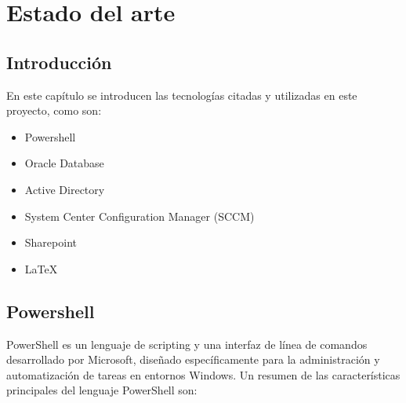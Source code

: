 \documentclass[a4paper, 12pt]{book}
\begin{document}
\cleardoublepage
\chapter{Estado del arte}
\label{chap:estado}

\section{Introducción}
\label{sec:Introducción}

En este capítulo se introducen las tecnologías citadas y utilizadas en este proyecto, como son:

\begin{itemize}
\item Powershell

\item Oracle Database

\item Active Directory

\item System Center Configuration Manager (SCCM)

\item Sharepoint

\item LaTeX
\end{itemize}

\section{Powershell}
\label{sec:Powershell}

PowerShell es un lenguaje de scripting y una interfaz de línea de comandos desarrollado por Microsoft, diseñado específicamente para la administración y automatización de tareas en entornos Windows. Un resumen de las características principales del lenguaje PowerShell son:
\end{document}

